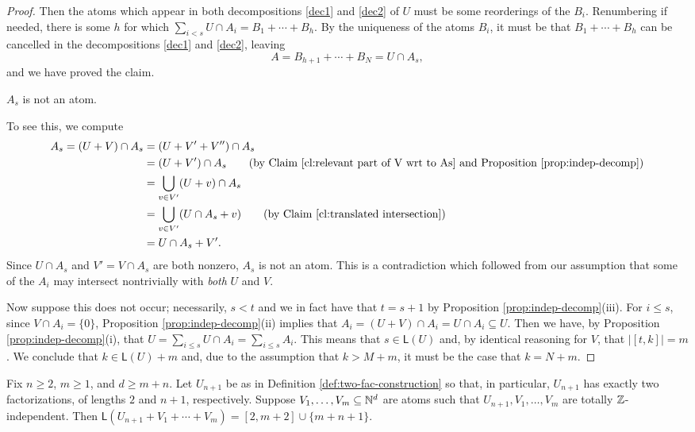 \begin{proof}
	Then the atoms which appear in both decompositions \ref{dec1} and \ref{dec2} of $U$ must be some reorderings of the $B_i$.
	Renumbering if needed, there is some $h$ for which $\sum_{i<s} U\cap A_i = B_1 + \cdots + B_h$.
	By the uniqueness of the atoms $B_i$, it must be that $B_1 +\cdots + B_h$ can be cancelled in the decompositions \ref{dec1} and \ref{dec2}, leaving
	\[ A = B_{h+1} +\cdots+ B_{N} = U\cap A_s, \]
	and we have proved the claim.
	
	\begin{claim} \label{cl:orth-decomp of As}
	$A_s$ is not an atom. \label{clf}
	\end{claim}
	
	To see this, we compute
	\begin{align*}
	A_s = (U+V)\cap A_s 
	&= (U+V'+V'') \cap A_s \\
	&= (U+V') \cap A_s \tag{by Claim \ref{cl:relevant part of V wrt to As} and Proposition \ref{prop:indep-decomp}} \\
	&= \bigcup_{v\in V'} (U+v)\cap A_s \\
	&= \bigcup_{v\in V'} (U\cap A_s + v) \tag{by Claim \ref{cl:translated intersection}} \\
	&= U\cap A_s + V'.
	\end{align*}
	Since $U\cap A_s$ and $V' = V\cap A_s$ are both nonzero, $A_s$ is not an atom.
	This is a contradiction which followed from our assumption that some of the $A_i$ may intersect nontrivially with \textit{both} $U$ and $V$.
	
	Now suppose this does not occur; necessarily, $s < t$ and we in fact have that $t = s+1$ by Proposition \ref{prop:indep-decomp}(iii).
	For $i \le s$, since $V\cap A_i  = \{0\}$, Proposition \ref{prop:indep-decomp}(ii) implies that $A_i = (U+V)\cap A_i = U\cap A_i \subseteq U$.
	Then we have, by Proposition \ref{prop:indep-decomp}(i), that $U = \sum_{i\le s} U\cap A_i = \sum_{i\le s} A_i$.
	This means that $s\in \mathsf{L}(U)$ and, by identical reasoning for $V$, that $| [ t,k ]| = m$.
	We conclude that $k \in \mathsf{L}(U) + m$ and, due to the assumption that $k>M+m$, it must be the case that $k = N + m$.
\end{proof}


\begin{thm} \label{thm:int-point-construction}
	Fix $n\ge 2$, $m\ge 1$, and $d\ge m+n$.
	Let $U_{n+1}$ be as in Definition \ref{def:two-fac-construction} so that, in particular, $U_{n+1}$ has exactly two factorizations, of lengths $2$ and $n+1$, respectively.  
	Suppose $V_1,\dots, V_m \subseteq \mathbb{N}^d$ are atoms such that $U_{n+1},V_1,\dots, V_m$ are totally $\mathbb{Z}$-independent.
	Then $\mathsf{L}(U_{n+1}+V_1+\cdots+V_m) = [ 2,m+2 ] \cup \{m+n+1\}$.
\end{thm}

